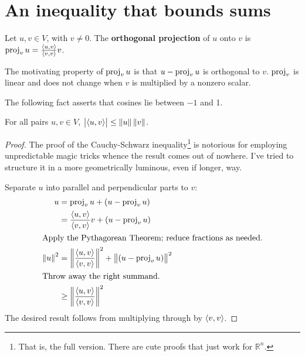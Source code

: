 \section{An inequality that bounds sums}
\begin{definition}
  Let \(u, v \in V\), with \(v \neq 0\).
  The \textbf{orthogonal projection} of \(u\) onto \(v\) is
  \(\operatorname{\mathrm{proj}}_{v}u = \frac{\left\langle u, v\right\rangle}{\left\langle v, v\right\rangle}v\).
\end{definition}
The motivating property of \(\operatorname{\mathrm{proj}}_v u\) is that \(u - \operatorname{\mathrm{proj}}_v u\) is orthogonal to \(v\).
\(\operatorname{\mathrm{proj}}_v\) is linear and does not change when \(v\) is multiplied by a nonzero scalar.

The following fact asserts that cosines lie between \(-1\) and 1.
\begin{theorem}
  For all pairs \(u, v \in V\), \(\left|\left\langle u, v\right\rangle \right| \leq \left\|u\right\| \left\|v\right\|\).
\end{theorem}
\begin{proof}
  The proof of the Cauchy-Schwarz inequality\footnote{That is, the full version. There are cute proofs that just work for \(\mathbb{R}^n\).} is notorious for employing unpredictable magic tricks whence the result comes out of nowhere.
  I've tried to structure it in a more geometrically luminous, even if longer, way.

  Separate \(u\) into parallel and perpendicular parts to \(v\):
  \begin{align}
    u &= \proj_v u + \del{u - \proj_v u} \\
    &= \frac{\innerprod{u}{v}}{\innerprod{v}{v}} v
    + \del{u - \proj_v u}\\
    \intertext{Apply the Pythagorean Theorem; reduce fractions as needed.}
    \left\|u\right\|^2
    &= \left\|\frac{\innerprod{u}{v}}{\innerprod{v}{v}}\right\|^2 +
    \left\|\del{u - \proj_v u}\right\|^2\\
    \intertext{Throw away the right summand.}
    &\geq \left\|\frac{\innerprod{u}{v}}{\innerprod{v}{v}}\right\|^2
  \end{align}
  The desired result follows from multiplying through by \(\left\langle v, v\right\rangle\).
\end{proof}

